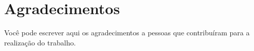 
\newpage

\chapter*{Agradecimentos} %

	Você pode escrever aqui os agradecimentos a pessoas que contribuíram para a realização do trabalho.
	
	\thispagestyle{empty}